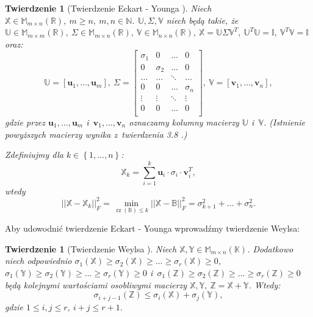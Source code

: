 \documentclass[12pt,a4paper]{report}
\newtheorem{tw}[df]{Twierdzenie}
\newcommand{\set}[1]{\left\lbrace {#1} \right\rbrace}
\newcommand{\setR}{\mathbb{R}}
\newcommand{\setK}{\mathbb{K}}
\newcommand{\setN}{\mathbb{N}}
\newcommand{\rz}[1]{\operatorname{rz}\left({#1} \right)}
\begin{document}
\begin{tw}[Twierdzenie Eckart - Younga {\citep{ulafiir}}]%
Niech $\mathbb{X} \in \mathbb{M}_{m \times n}(\setR),\: m \geq n, \:  m,n \in \setN$. $\mathbb{U}, \Sigma, \mathbb{V}$ niech będą takie, że $\mathbb{U} \in \mathbb{M}_{m \times m}(\setR), \: \Sigma \in \mathbb{M}_{m \times n}(\setR), \: \mathbb{V} \in \mathbb{M}_{n \times n}(\setR), \: \mathbb{X}=\mathbb{U}\Sigma \mathbb{V}^T, \: \mathbb{U}^T \mathbb{U} = \mathbb{I}, \: \mathbb{V}^T \mathbb{V} =\mathbb{I}$ oraz:
$$
\mathbb{U} = [\mathbf{u}_1, \ldots, \mathbf{u}_m], \: \Sigma = \left[
        \begin{array}{cccc}
         \sigma_{1} & 0 & \ldots & 0 \\
         0 & \sigma_{2} & \ldots & 0 \\
         \ldots & \ldots& \ddots & \ldots \\
         0 & 0 & \ldots & \sigma_{n} \\
         \vdots & \vdots & \ddots & \vdots \\
         0 & 0 & \ldots & 0 \\
         \end{array}
      \right], \: \mathbb{V} = [\mathbf{v}_1, \ldots, \mathbf{v}_n],
$$
gdzie przez $\mathbf{u}_1, \ldots, \mathbf{u}_m$ i~$\mathbf{v}_1, \ldots, \mathbf{v}_n$ oznaczamy kolumny macierzy $\mathbb{U}$ i~$\mathbb{V}$. (Istnienie powyższych macierzy wynika z~twierdzenia 3.8 .) 

Zdefiniujmy dla $k \in \set{1, \ldots, n}$:
$$
\mathbb{X}_k = \sum_{i=1}^k \mathbf{u}_i\cdot \sigma_{i} \cdot \mathbf{v}_i^T,
$$
wtedy
$$
||\mathbb{X} - \mathbb{X}_k||_F^2 = \min \limits_{\rz{\mathbb{B}} \leqslant k } ||\mathbb{X} - \mathbb{B}||_F^2 = \sigma_{k+1}^2 + ... + \sigma_{n}^2.
$$
\end{tw}

Aby udowodnić twierdzenie Eckart - Younga wprowadźmy twierdzenie Weylsa:

\begin{tw}[Twierdzenie Weylsa {\citep[Tw. 4.17]{tsvdalra}}]
Niech $\mathbb{X}, \mathbb{Y} \in \mathbb{M}_{m \times n}(\setK)$.
Dodatkowo niech odpowiednio $\sigma_1(\mathbb{X}) \geq \sigma_2(\mathbb{X})\geq \ldots \geq \sigma_r(\mathbb{X})\geq 0$, $\sigma_1(\mathbb{Y}) \geq \sigma_2(\mathbb{Y})\geq \ldots \geq \sigma_r(\mathbb{Y})\geq 0$ i~$\sigma_1(\mathbb{Z}) \geq \sigma_2(\mathbb{Z})\geq \ldots \geq \sigma_r(\mathbb{Z})\geq 0$ będą kolejnymi wartościami osobliwymi macierzy $\mathbb{X}, \mathbb{Y}, \: \mathbb{Z}=\mathbb{X} + \mathbb{Y}$. Wtedy:
$$
\sigma_{i+j-1}(\mathbb{Z}) \leq \sigma_i(\mathbb{X}) + \sigma_j(\mathbb{Y}),
$$
gdzie $1 \leq i,j \leq r$, $i+j\leq r+1$.
\end{tw}
\end{document}
